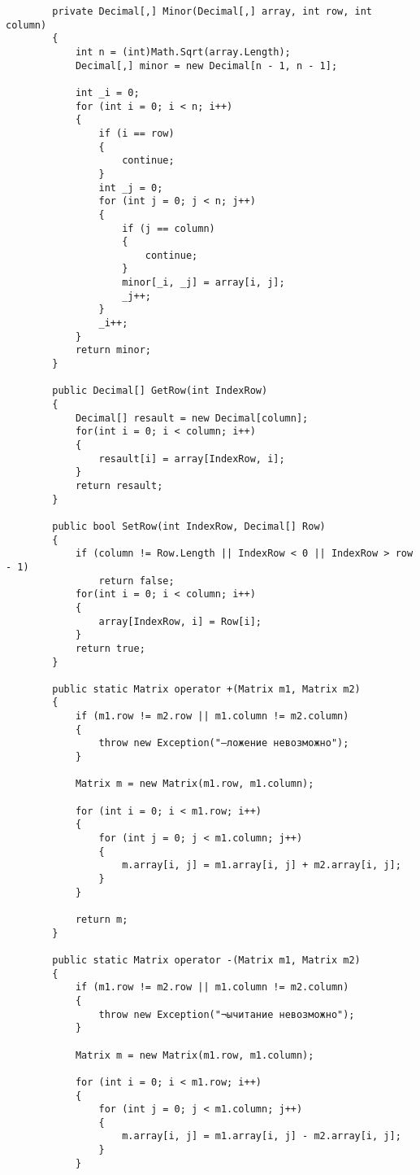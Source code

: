 \documentclass[12pt]{article} %
\begin{document}
\begin{verbatim}
        private Decimal[,] Minor(Decimal[,] array, int row, int column)
        {
            int n = (int)Math.Sqrt(array.Length);
            Decimal[,] minor = new Decimal[n - 1, n - 1];

            int _i = 0;
            for (int i = 0; i < n; i++)
            {
                if (i == row)
                {
                    continue;
                }
                int _j = 0;
                for (int j = 0; j < n; j++)
                {
                    if (j == column)
                    {
                        continue;
                    }
                    minor[_i, _j] = array[i, j];
                    _j++;
                }
                _i++;
            }
            return minor;
        }

        public Decimal[] GetRow(int IndexRow)
        {
            Decimal[] resault = new Decimal[column];
            for(int i = 0; i < column; i++)
            {
                resault[i] = array[IndexRow, i];
            }
            return resault;
        }

        public bool SetRow(int IndexRow, Decimal[] Row)
        {
            if (column != Row.Length || IndexRow < 0 || IndexRow > row - 1)
                return false;
            for(int i = 0; i < column; i++)
            {
                array[IndexRow, i] = Row[i];
            }
            return true;
        }

        public static Matrix operator +(Matrix m1, Matrix m2)
        {
            if (m1.row != m2.row || m1.column != m2.column)
            {
                throw new Exception("—ложение невозможно");
            }

            Matrix m = new Matrix(m1.row, m1.column);

            for (int i = 0; i < m1.row; i++)
            {
                for (int j = 0; j < m1.column; j++)
                {
                    m.array[i, j] = m1.array[i, j] + m2.array[i, j];
                }
            }

            return m;
        }

        public static Matrix operator -(Matrix m1, Matrix m2)
        {
            if (m1.row != m2.row || m1.column != m2.column)
            {
                throw new Exception("¬ычитание невозможно");
            }

            Matrix m = new Matrix(m1.row, m1.column);

            for (int i = 0; i < m1.row; i++)
            {
                for (int j = 0; j < m1.column; j++)
                {
                    m.array[i, j] = m1.array[i, j] - m2.array[i, j];
                }
            }


\end{verbatim}
\end{document}
